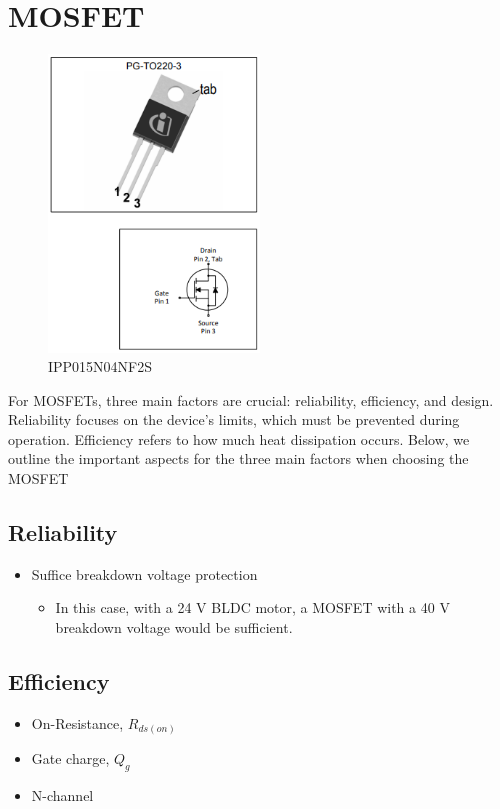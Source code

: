 \section{MOSFET}
\begin{figure}[H]
    \centering
    \includegraphics[width=0.5\textwidth]{img/MOSFET/MOSFET.png}
    \caption{IPP015N04NF2S}
    \label{fig:MOSFET:IPP015N04NF2S}
\end{figure}
For MOSFETs, three main factors are crucial: reliability, efficiency, and design. Reliability focuses on the device's limits, which must be prevented during operation. Efficiency refers to how much heat dissipation occurs.
Below, we outline the important aspects for the three main factors when choosing the MOSFET \cite{Proper-Specs-MOSFET}

\subsection{Reliability}
\begin{itemize}
    \item Suffice breakdown voltage protection
    \begin{itemize}
        \item In this case, with a 24 V BLDC motor, a MOSFET with a 40 V breakdown voltage would be sufficient.
    \end{itemize}
\end{itemize}

\subsection{Efficiency}
\begin{itemize}
    \item On-Resistance, $R_{ds(on)}$
    \item Gate charge, $Q_{g}$ 
    \item N-channel 
\end{itemize}

